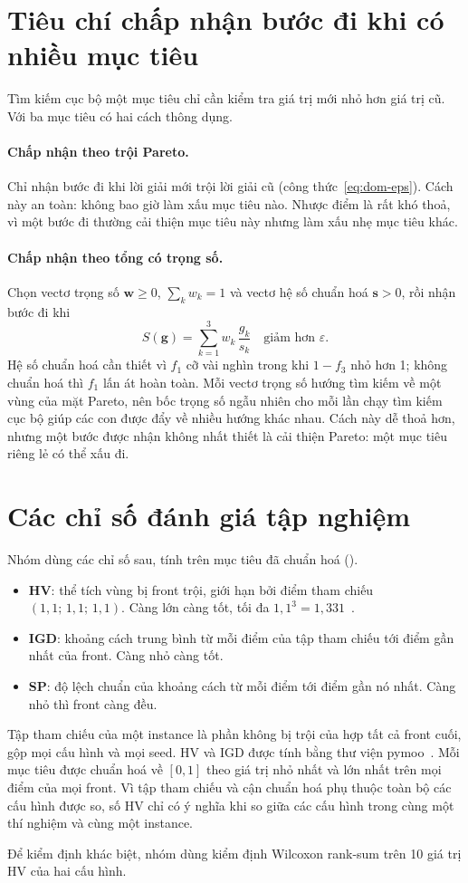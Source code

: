 \section{Tiêu chí chấp nhận bước đi khi có nhiều mục tiêu}

Tìm kiếm cục bộ một mục tiêu chỉ cần kiểm tra giá trị mới nhỏ hơn giá trị cũ. Với ba mục tiêu có hai
cách thông dụng.

\paragraph{Chấp nhận theo trội Pareto.} Chỉ nhận bước đi khi lời giải mới trội lời giải cũ
(công thức~\ref{eq:dom-eps}). Cách này an toàn: không bao giờ làm xấu mục tiêu nào. Nhược điểm là rất
khó thoả, vì một bước đi thường cải thiện mục tiêu này nhưng làm xấu nhẹ mục tiêu khác.

\paragraph{Chấp nhận theo tổng có trọng số.} Chọn vectơ trọng số $\mathbf{w} \ge 0$,
$\sum_k w_k = 1$ và vectơ hệ số chuẩn hoá $\mathbf{s} > 0$, rồi nhận bước đi khi
\begin{equation}
  S(\mathbf{g}) = \sum_{k=1}^{3} w_k\,\frac{g_k}{s_k}
  \quad\text{giảm hơn } \varepsilon .
  \label{eq:score}
\end{equation}
Hệ số chuẩn hoá cần thiết vì $f_1$ cỡ vài nghìn trong khi $1-f_3$ nhỏ hơn 1; không chuẩn hoá thì $f_1$
lấn át hoàn toàn. Mỗi vectơ trọng số hướng tìm kiếm về một vùng của mặt Pareto, nên bốc trọng số ngẫu
nhiên cho mỗi lần chạy tìm kiếm cục bộ giúp các con được đẩy về nhiều hướng khác nhau. Cách này dễ thoả
hơn, nhưng một bước được nhận không nhất thiết là cải thiện Pareto: một mục tiêu riêng lẻ có thể xấu đi.

\section{Các chỉ số đánh giá tập nghiệm}

Nhóm dùng các chỉ số sau, tính trên mục tiêu đã chuẩn hoá ().
\begin{itemize}
  \item \textbf{HV}: thể tích vùng bị front trội, giới hạn bởi điểm tham chiếu $(1{,}1;\,1{,}1;\,1{,}1)$.
        Càng lớn càng tốt, tối đa $1{,}1^3 = 1{,}331$~\cite{zitzler1999}.
  \item \textbf{IGD}: khoảng cách trung bình từ mỗi điểm của tập tham chiếu tới điểm gần nhất của front.
        Càng nhỏ càng tốt.
  \item \textbf{SP}: độ lệch chuẩn của khoảng cách từ mỗi điểm tới điểm gần nó nhất. Càng nhỏ thì front
        càng đều.
\end{itemize}
Tập tham chiếu của một instance là phần không bị trội của hợp tất cả front cuối, gộp mọi cấu hình và
mọi seed. HV và IGD được tính bằng thư viện pymoo~\cite{pymoo}. Mỗi mục tiêu được chuẩn hoá về $[0,1]$ theo giá trị nhỏ nhất và lớn nhất trên mọi điểm của
mọi front. Vì tập tham chiếu và cận chuẩn hoá phụ thuộc toàn bộ các cấu hình được so, số HV chỉ có ý
nghĩa khi so giữa các cấu hình trong cùng một thí nghiệm và cùng một instance.

Để kiểm định khác biệt, nhóm dùng kiểm định Wilcoxon rank-sum trên 10 giá trị HV của hai cấu hình.
